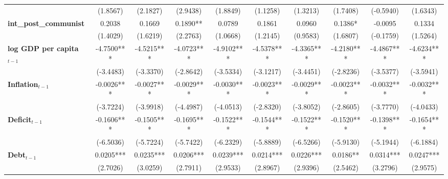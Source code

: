 \begin{center}
\begin{tabular}{lccccccccc}
\textbf{ }                         &    (1.8567)    &     (2.1827)     &     (2.9438)     &     (1.8849)     &     (1.1258)     &     (1.3213)     &     (1.7408)     &    (-0.5940)     &     (1.6343)      \\
\textbf{int\_post\_communist}      &     0.2038     &      0.1669      &     0.1890**     &      0.0789      &      0.1861      &      0.0960      &     0.1386*      &     -0.0095      &      0.1334       \\
\textbf{ }                         &    (1.4029)    &     (1.6219)     &     (2.2763)     &     (1.0668)     &     (1.2145)     &     (0.9583)     &     (1.6807)     &    (-0.1759)     &     (1.5264)      \\
\textbf{log GDP per capita$_{t-1}$}           &   -4.7500***   &    -4.5215***    &    -4.0723***    &    -4.9102***    &    -4.5378***    &    -4.3365***    &    -4.2180***    &    -4.4867***    &    -4.6234***     \\
\textbf{ }                         &   (-3.4483)    &    (-3.3370)     &    (-2.8642)     &    (-3.5334)     &    (-3.1217)     &    (-3.4451)     &    (-2.8236)     &    (-3.5377)     &    (-3.5941)      \\
\textbf{Inflation$_{t-1}$}      &   -0.0026***   &    -0.0027***    &    -0.0029***    &    -0.0030***    &    -0.0023***    &    -0.0029***    &    -0.0023***    &    -0.0032***    &    -0.0032***     \\
\textbf{ }                         &   (-3.7224)    &    (-3.9918)     &    (-4.4987)     &    (-4.0513)     &    (-2.8320)     &    (-3.8052)     &    (-2.8605)     &    (-3.7770)     &    (-4.0433)      \\
\textbf{Deficit$_{t-1}$}             &   -0.1606***   &    -0.1505***    &    -0.1695***    &    -0.1522***    &    -0.1544***    &    -0.1522***    &    -0.1520***    &    -0.1398***    &    -0.1654***     \\
\textbf{ }                         &   (-6.5036)    &    (-5.7224)     &    (-5.7422)     &    (-6.2329)     &    (-5.8889)     &    (-6.5266)     &    (-5.9130)     &    (-5.1944)     &    (-6.1884)      \\
\textbf{Debt$_{t-1}$}                &   0.0205***    &    0.0235***     &    0.0206***     &    0.0239***     &    0.0214***     &    0.0226***     &     0.0186**     &    0.0314***     &    0.0247***      \\
\textbf{ }                         &    (2.7026)    &     (3.0259)     &     (2.7911)     &     (2.9533)     &     (2.8967)     &     (2.9396)     &     (2.5462)     &     (3.2796)     &     (2.9575)      \\

\end{tabular}
\end{center}
